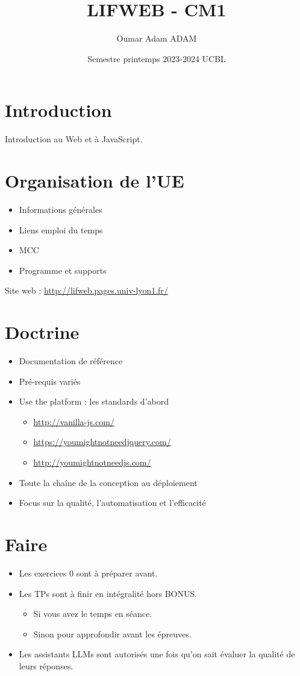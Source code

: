 \documentclass{article}
\title{LIFWEB - CM1}
\author{Oumar Adam ADAM}
\date{Semestre printemps 2023-2024 UCBL}
\begin{document}
\maketitle

\section{Introduction}
Introduction au Web et à JavaScript.

\section{Organisation de l’UE}
\begin{itemize}
    \item Informations générales
    \item Liens emploi du temps
    \item MCC
    \item Programme et supports
\end{itemize}
Site web : \url{http://lifweb.pages.univ-lyon1.fr/}

\section{Doctrine}
\begin{itemize}
    \item Documentation de référence
    \item Pré-requis variés
    \item Use the platform : les standards d’abord
    \begin{itemize}
        \item \url{http://vanilla-js.com/}
        \item \url{https://youmightnotneedjquery.com/}
        \item \url{http://youmightnotneedjs.com/}
    \end{itemize}
    \item Toute la chaîne de la conception au déploiement
    \item Focus sur la qualité, l’automatisation et l’efficacité
\end{itemize}

\section{Faire}
\begin{itemize}
    \item Les exercices 0 sont à préparer avant.
    \item Les TPs sont à finir en intégralité hors BONUS.
    \begin{itemize}
        \item Si vous avez le temps en séance.
        \item Sinon pour approfondir avant les épreuves.
    \end{itemize}
    \item Les assistants LLMs sont autorisés une fois qu’on sait évaluer la qualité de leurs réponses.
\end{itemize}
\end{document}
